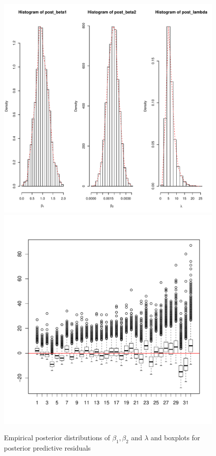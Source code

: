 \documentclass[]{article}
\begin{document}
\begin{enumerate}
{\begin{itemize}
\begin{figure}[ht!]
				\includegraphics[scale = 0.4]{"pic/HW5_1/pos1"}
				\includegraphics[scale = 0.4]{"pic/HW5_1/box1"}
				\caption{Empirical posterior distributions of $\beta_1, \beta_2$ and $\lambda$ and boxplots for posterior predictive residuals}

\end{figure}
\end{itemize}}
\end{enumerate}
\end{document}
